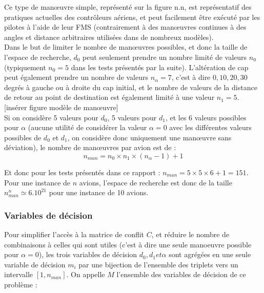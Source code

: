 Ce type de manœuvre simple, représenté sur la figure n.n, est représentatif des pratiques actuelles des contrôleurs aériens, et peut facilement être exécuté par les pilotes à l'aide de leur FMS (contrairement à des manœuvres continues à des angles et distance arbitraires utilisées dans de nombreux modèles).\\



Dans le but de limiter le nombre de manœuvres possibles, et donc la taille de l'espace de recherche, $d_{0}$ peut seulement prendre un nombre limité de valeurs $n_{0}$ (typiquement $n_{0} = 5$ dans les tests présentés par la suite). L'altération de cap peut également prendre un nombre de valeurs $n_{\alpha} = 7$, c'est à dire $0,10,20,30$ degrés à gauche ou à droite du cap initial, et le nombre de valeurs de la distance de retour au point de destination est également limité à une valeur $n_{1} = 5$.\\

[insérer figure modèle de manœuvre]\\

Si on considère 5 valeurs pour $d_{0}$, 5 valeurs pour $d_{1}$, et les 6 valeurs possibles pour $\alpha$ (aucune utilité de considérer la valeur $\alpha = 0$ avec les différentes valeurs possibles de $d_{0}$ et $d_{1}$, on considère donc uniquement une manœuvre sans déviation), le nombre de manœuvres par avion est de : \\

\begin{equation}
n_{man} = n_{0}\times n_{1}\times(n_{\alpha}-1) +1 
\end{equation}

Et donc pour les tests présentés dans ce rapport : $n_{man} = 5\times 5\times 6 +1 = 151$. Pour une instance de $n$ avions, l'espace de recherche est donc de la taille $n_{man}^{n}\simeq 6.10^{21}$ pour une instance de 10 avions.

\subsubsection*{Variables de décision}

Pour simplifier l'accès à la matrice de conflit $C$, et réduire le nombre de combinaisons à celles qui sont utiles (c'est à dire une seule manoeuvre possible pour $\alpha = 0$), les trois variables de décision $d_{0}, d_{1} et \alpha$ sont agrégées en une seule variable de décision $m_{i}$ par une bijection de l'ensemble des triplets vers un intervalle $[1,n_{man}]$. On appelle $M$ l'ensemble des variables de décision de ce problème : \\

